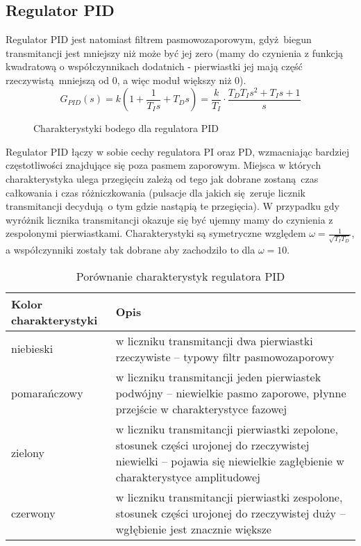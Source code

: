 \documentclass[a4paper, 10pt]{article}
\begin{document}
		\subsection{Regulator PID}
			Regulator PID jest natomiast filtrem pasmowozaporowym, gdyż biegun transmitancji jest mniejszy niż może być jej zero (mamy do czynienia z funkcją kwadratową o współczynnikach dodatnich - pierwiastki jej mają część rzeczywistą mniejszą od 0, a więc moduł większy niż 0). 
			$$
				G_{PID}(s) = k\left(1 + \frac{1}{T_Is} + T_Ds\right) = \frac{k}{T_I}
					\cdot \frac{T_DT_Is^2 + T_Is + 1}{s}
			$$
			\begin{figure}[H]
				\centering
				\def \svgwidth{0.7\columnwidth}
				
				\caption{Charakterystyki bodego dla regulatora PID}
			\end{figure}\noindent
			Regulator PID łączy w sobie cechy regulatora PI oraz PD, wzmacniając bardziej częstotliwości znajdujące się poza pasmem zaporowym. Miejsca w których charakterystyka ulega przegięciu zależą od tego jak dobrane zostaną czas całkowania i czas różniczkowania (pulsacje dla jakich się zeruje licznik transmitancji decydują o tym gdzie nastąpią te przegięcia). W przypadku gdy wyróżnik licznika transmitancji okazuje się być ujemny mamy do czynienia z zespolonymi pierwiastkami. Charakterystyki są symetryczne  względem $\omega = \frac{1}{\sqrt{T_IT_D}}$, a współczynniki zostały tak dobrane aby zachodziło to dla $\omega = 10$.
			\begin{center}
				\begin{table}[H]
					\caption{Porównanie charakterystyk regulatora PID}
					\begin{tabular}{|p{}|p{}|}
						\hline 
						Kolor charakterystyki& Opis\\
						\hline
						niebieski &  w liczniku transmitancji dwa pierwiastki rzeczywiste -- typowy filtr pasmowozaporowy \\ 
						\hline 
						pomarańczowy & w liczniku transmitancji jeden pierwiastek podwójny -- niewielkie pasmo zaporowe, płynne przejście w charakterystyce fazowej \\ 
						\hline 
						zielony & w liczniku transmitancji pierwiastki zepolone, stosunek części urojonej do rzeczywistej niewielki -- pojawia się niewielkie zagłębienie w charakterystyce amplitudowej   \\ 
						\hline 
						czerwony & w liczniku transmitancji pierwiastki zespolone, stosunek części urojonej do rzeczywistej duży -- wgłębienie jest znacznie większe \\ 
						\hline 
					\end{tabular}
				\end{table}
			\end{center}
\end{document}
